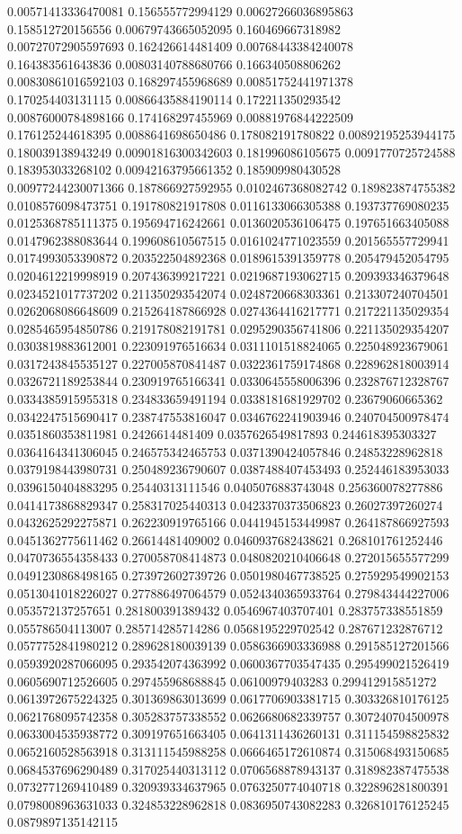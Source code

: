 \begin{table}
\begin{tabu}
\begin{sparkline}{10}
0.00571413336470081 0.156555772994129 0.00627266036895863 0.158512720156556 0.00679743665052095 0.160469667318982 0.00727072905597693 0.162426614481409 0.00768443384240078 0.164383561643836 0.00803140788680766 0.166340508806262 0.00830861016592103 0.168297455968689 0.00851752441971378 0.170254403131115 0.00866435884190114 0.172211350293542 0.00876000784898166 0.174168297455969 0.00881976844222509 0.176125244618395 0.0088641698650486 0.178082191780822 0.00892195253944175 0.180039138943249 0.00901816300342603 0.181996086105675 0.0091770725724588 0.183953033268102 0.00942163795661352 0.185909980430528 0.00977244230071366 0.187866927592955 0.0102467368082742 0.189823874755382 0.0108576098473751 0.191780821917808 0.0116133066305388 0.193737769080235 0.0125368785111375 0.195694716242661 0.0136020536106475 0.197651663405088 0.0147962388083644 0.199608610567515 0.0161024771023559 0.201565557729941 0.0174993053390872 0.203522504892368 0.0189615391359778 0.205479452054795 0.0204612219998919 0.207436399217221 0.0219687193062715 0.209393346379648 0.0234521017737202 0.211350293542074 0.0248720668303361 0.213307240704501 0.0262068086648609 0.215264187866928 0.0274364416217771 0.217221135029354 0.0285465954850786 0.219178082191781 0.0295290356741806 0.221135029354207 0.0303819883612001 0.223091976516634 0.0311101518824065 0.225048923679061 0.0317243845535127 0.227005870841487 0.0322361759174868 0.228962818003914 0.0326721189253844 0.230919765166341 0.0330645558006396 0.232876712328767 0.0334385915955318 0.234833659491194 0.0338181681929702 0.23679060665362 0.0342247515690417 0.238747553816047 0.0346762241903946 0.240704500978474 0.0351860353811981 0.2426614481409 0.0357626549817893 0.244618395303327 0.0364164341306045 0.246575342465753 0.0371390424057846 0.24853228962818 0.0379198443980731 0.250489236790607 0.0387488407453493 0.252446183953033 0.0396150404883295 0.25440313111546 0.0405076883743048 0.256360078277886 0.0414173868829347 0.258317025440313 0.0423370373506823 0.26027397260274 0.0432625292275871 0.262230919765166 0.0441945153449987 0.264187866927593 0.0451362775611462 0.26614481409002 0.0460937682438621 0.268101761252446 0.0470736554358433 0.270058708414873 0.0480820210406648 0.272015655577299 0.0491230868498165 0.273972602739726 0.0501980467738525 0.275929549902153 0.0513041018226027 0.277886497064579 0.0524340365933764 0.279843444227006 0.053572137257651 0.281800391389432 0.0546967403707401 0.283757338551859 0.055786504113007 0.285714285714286 0.0568195229702542 0.287671232876712 0.0577752841980212 0.289628180039139 0.0586366903336988 0.291585127201566 0.0593920287066095 0.293542074363992 0.0600367703547435 0.295499021526419 0.0605690712526605 0.297455968688845 0.06100979403283 0.299412915851272 0.0613972675224325 0.301369863013699 0.0617706903381715 0.303326810176125 0.0621768095742358 0.305283757338552 0.0626680682339757 0.307240704500978 0.0633004535938772 0.309197651663405 0.0641311436260131 0.311154598825832 0.0652160528563918 0.313111545988258 0.0666465172610874 0.315068493150685 0.0684537696290489 0.317025440313112 0.0706568878943137 0.318982387475538 0.0732771269410489 0.320939334637965 0.0763250774040718 0.322896281800391 0.0798008963631033 0.324853228962818 0.0836950743082283 0.326810176125245 0.0879897135142115 
\end{sparkline}
\end{tabu}
\end{table}
